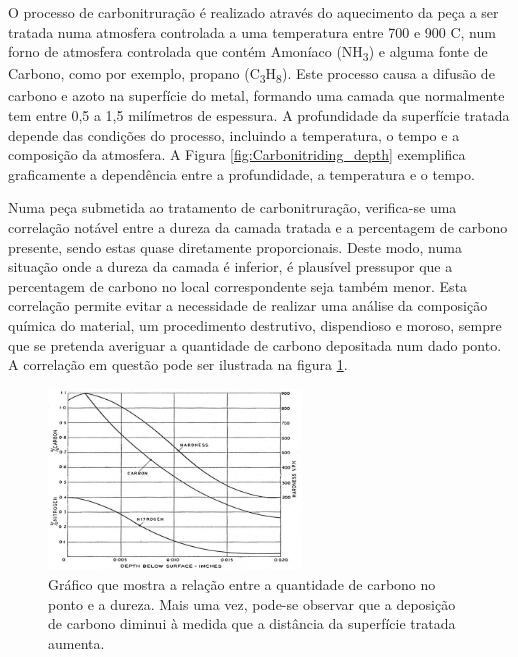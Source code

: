 \par
O processo de carbonitruração é realizado através do aquecimento da peça a ser tratada numa atmosfera controlada a uma temperatura entre 700 e 900 \textdegree C, num forno de atmosfera controlada que contém Amoníaco (NH\textsubscript{3}) e alguma fonte de Carbono, como por exemplo, propano (C\textsubscript{3}H\textsubscript{8}). Este processo causa a difusão de carbono e azoto na superfície do metal, formando uma camada que normalmente tem entre 0,5 a 1,5 milímetros de espessura\cite{Rajan2011}. A profundidade da superfície tratada depende das condições do processo, incluindo a temperatura, o tempo e a composição da atmosfera. A Figura \ref{fig:Carbonitriding_depth} exemplifica graficamente a dependência entre a profundidade, a temperatura e o tempo.
\newpage
\par
Numa peça submetida ao tratamento de carbonitruração, verifica-se uma correlação notável entre a dureza da camada tratada e a percentagem de carbono presente, sendo estas quase diretamente proporcionais. Deste modo, numa situação onde a dureza da camada é inferior, é plausível pressupor que a percentagem de carbono no local correspondente seja também menor. Esta correlação permite evitar a necessidade de realizar uma análise da composição química do material, um procedimento destrutivo, dispendioso e moroso, sempre que se pretenda averiguar a quantidade de carbono depositada num dado ponto. A correlação em questão pode ser ilustrada na figura \ref{fig:Carbon_Hardness_Carbonitriding}.
\begin{figure}[htb]
    \centering
    \includegraphics[width = 0.6\textwidth]{Figures/Cap2/Carbon_Hardness_Carbonitriding.png}
    \caption[Relação entre carbono, azoto e dureza]%
    {Gráfico que mostra a relação entre a quantidade de carbono no ponto e a dureza\cite{Herring2011}. Mais uma vez, pode-se observar que a deposição de carbono diminui à medida que a distância da superfície tratada aumenta.}
    \label{fig:Carbon_Hardness_Carbonitriding}
\end{figure}
